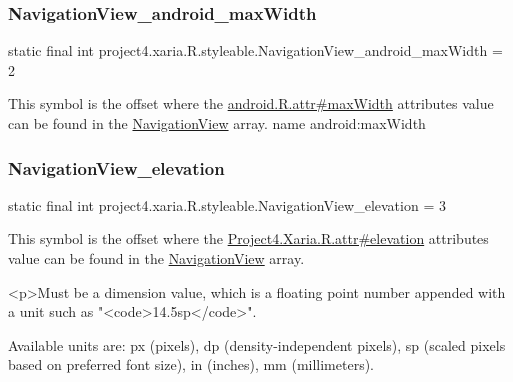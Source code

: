 \subsubsection{\texorpdfstring{Navigation\+View\+\_\+android\+\_\+max\+Width}{NavigationView\_android\_maxWidth}}
{\footnotesize\ttfamily static final int project4.\+xaria.\+R.\+styleable.\+Navigation\+View\+\_\+android\+\_\+max\+Width = 2\hspace{0.3cm}{\ttfamily [static]}}

This symbol is the offset where the \hyperlink{}{android.\+R.\+attr\#max\+Width} attribute\textquotesingle{}s value can be found in the \hyperlink{classproject4_1_1xaria_1_1R_1_1styleable_a93b7138d1a19f728c4d3933a75ce23e2}{Navigation\+View} array.  name android\+:max\+Width \mbox{\label{classproject4_1_1xaria_1_1R_1_1styleable_a40197d42f2fce56d33d3778b865afb7d}} 
\subsubsection{\texorpdfstring{Navigation\+View\+\_\+elevation}{NavigationView\_elevation}}
{\footnotesize\ttfamily static final int project4.\+xaria.\+R.\+styleable.\+Navigation\+View\+\_\+elevation = 3\hspace{0.3cm}{\ttfamily [static]}}

This symbol is the offset where the \hyperlink{}{Project4.\+Xaria.\+R.\+attr\#elevation} attribute\textquotesingle{}s value can be found in the \hyperlink{classproject4_1_1xaria_1_1R_1_1styleable_a93b7138d1a19f728c4d3933a75ce23e2}{Navigation\+View} array.

\begin{DoxyVerb}      <p>Must be a dimension value, which is a floating point number appended with a unit such as "<code>14.5sp</code>".
\end{DoxyVerb}
 Available units are\+: px (pixels), dp (density-\/independent pixels), sp (scaled pixels based on preferred font size), in (inches), mm (millimeters). 


